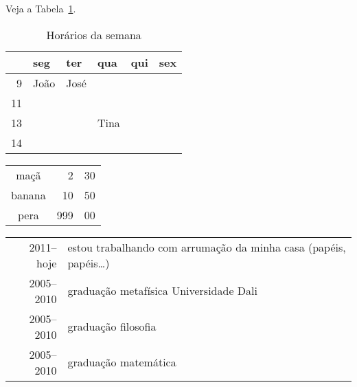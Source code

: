

\usepackage{hyperref}



\listoftables
Veja a Tabela~\ref{tab:horarios}.
\begin{table}
\begin{center}
\begin{tabular}{rlllll}
\hline
   & seg & ter & qua & qui & sex \\
   \hline
9 & João& José&     &     &     \\
11 &     &     &     &     &     \\
13 &     &     & Tina&     &     \\
14 &     &     &     &     &     \\
\hline
\end{tabular}
\end{center}
\caption{Horários da semana}
\label{tab:horarios}
\end{table}

\clearpage





\begin{tabular}{c@{ está valendo $\to$ }r@{,}l}
maçã   &   2 & 30 \\
banana &  10 & 50 \\
pera   & 999 & 00 
\end{tabular}




\clearpage
%
\begin{tabular}{r|p{8cm}}
2011--hoje & estou trabalhando com arrumação da minha casa (papéis, papéis\ldots)\\
2005--2010 & graduação metafísica\newline
Universidade Dali\\[10pt]
2005--2010 & graduação filosofia\\
2005--2010 & graduação matemática\\
\end{tabular}


\cleartable






